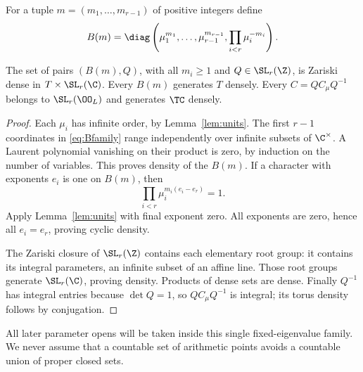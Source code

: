 For a tuple $m=(m_1,\ldots,m_{r-1})$ of positive integers define
\begin{equation}\label{eq:Bfamily}
 B(m)=\diag\left(\mu_1^{m_1},\ldots,\mu_{r-1}^{m_{r-1}},
                    \prod_{i<r}\mu_i^{-m_i}\right).
\end{equation}
\begin{lemma}\label{lem:arithmetic-dense}
The set of pairs $(B(m),Q)$, with all $m_i\geq1$ and
$Q\in\SL_r(\Z)$, is Zariski dense in $T\times\SL_r(\C)$.
Every $B(m)$ generates $T$ densely. Every
$C=QC_\mu Q^{-1}$ belongs to $\SL_r(\OO_L)$ and generates $\TC$ densely.
\end{lemma}
\begin{proof}
Each $\mu_i$ has infinite order, by Lemma~\ref{lem:units}. The first $r-1$
coordinates in \eqref{eq:Bfamily} range independently over infinite subsets
of $\C^\times$. A Laurent polynomial vanishing on their product is zero,
by induction on the number of variables. This proves density of the
$B(m)$. If a character with exponents $e_i$ is one on $B(m)$, then
\[
 \prod_{i<r}\mu_i^{m_i(e_i-e_r)}=1.
\]
Apply Lemma~\ref{lem:units} with final exponent zero. All exponents are
zero, hence all $e_i=e_r$, proving cyclic density.

The Zariski closure of $\SL_r(\Z)$ contains each elementary root group:
it contains its integral parameters, an infinite subset of an affine line.
Those root groups generate $\SL_r(\C)$, proving density. Products of dense
sets are dense. Finally $Q^{-1}$ has integral entries because $\det Q=1$,
so $QC_\mu Q^{-1}$ is integral; its torus density follows by conjugation.
\end{proof}

All later parameter opens will be taken inside this single fixed-eigenvalue
family. We never assume that a countable set of arithmetic points avoids a
countable union of proper closed sets.
